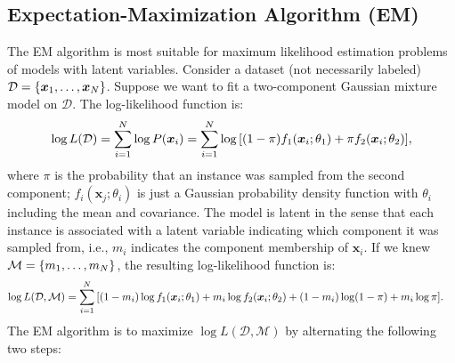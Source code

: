 \subsection{Expectation-Maximization Algorithm (EM)}
    The EM algorithm is most suitable for maximum likelihood estimation problems of models with latent variables.
    Consider a dataset (not necessarily labeled) $\mathcal{D} = \{ \bm{x}_1, \ldots, \bm{x}_N \}$.
    Suppose we want to fit a two-component Gaussian mixture model on $\mathcal{D}$.
    The log-likelihood function is:
        \begin{equation}
            \log L(\mathcal{D}) = \sum_{i=1}^{N}{\log P(\bm{x}_i)} = \sum_{i=1}^{N}{\log\left[ (1-\pi)f_1(\bm{x}_i; \theta_1) + \pi f_2(\bm{x}_i; \theta_2) \right]},
        \end{equation}
    where $\pi$ is the probability that an instance was sampled from the second component; $f_i(\bm{x}_j; \theta_i)$ is just a Gaussian probability density function with $\theta_i$ including the mean and covariance.
    The model is latent in the sense that each instance is associated with a latent variable indicating which component it was sampled from, i.e., $m_i$ indicates the component membership of $\bm{x}_i$.
    If we knew $\mathcal{M} = \{ m_1, \ldots, m_N \}$, the resulting log-likelihood function is:
        \begin{equation}
            \begin{aligned}
            \log L(\mathcal{D}, \mathcal{M}) & = \sum_{i=1}^{N}{
                \left[
                    (1 - m_i) \log f_1(\bm{x}_i; \theta_1) + m_i  \log f_2(\bm{x}_i; \theta_2) + 
                    (1 - m_i) \log(1 - \pi) + m_i \log\pi
                \right]
            }.
            \end{aligned}
        \end{equation}
    The EM algorithm is to maximize $\log L(\mathcal{D}, \mathcal{M})$ by alternating the following two steps:
